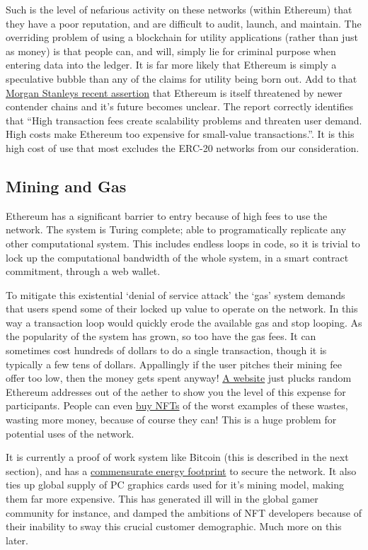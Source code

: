 Such is the level of nefarious activity on these networks (within Ethereum) that they have a poor reputation, and are difficult to audit, launch, and maintain. The overriding problem of using a blockchain for utility applications (rather than just as money) is that people can, and will, simply lie for criminal purpose when entering data into the ledger. It is far more likely that Ethereum is simply a speculative bubble than any of the claims for utility being born out. Add to that \href{https://advisor.morganstanley.com/daron.edwards/documents/field/d/da/daron-edwards/Cryptocurrency_201__What_is_Ethereum_.pdf}{Morgan Stanleys recent assertion} that Ethereum is itself threatened by newer contender chains and it's future becomes unclear. The report correctly identifies that ``High transaction fees create scalability problems and threaten user demand. High costs make Ethereum too expensive for small-value transactions.''. It is this high cost of use that most excludes the ERC-20 networks from our consideration.
\subsection{Mining and Gas}
Ethereum has a significant barrier to entry because of high fees to use the network. The system is Turing complete; able to programatically replicate any other computational system. This includes endless loops in code, so it is trivial to lock up the computational bandwidth of the whole system, in a smart contract commitment, through a web wallet. \par 
To mitigate this existential `denial of service attack' the `gas' system demands that users spend some of their locked up value to operate on the network. In this way a transaction loop would quickly erode the available gas and stop looping. As the popularity of the system has grown, so too have the gas fees. It can sometimes cost hundreds of dollars to do a single transaction, though it is typically a few tens of dollars. Appallingly if the user pitches their mining fee offer too low, then the money gets spent anyway! \href{https://fees.wtf/#/}{A website} just plucks random Ethereum addresses out of the aether to show you the level of this expense for participants. People can even \href{https://opensea.io/collection/fees-wtf-nft?search[sortAscending]=false&search[sortBy]=PRICE}{buy NFTs} of the worst examples of these wastes, wasting more money, because of course they can! This is a huge problem for potential uses of the network. \par
It is currently a proof of work system like Bitcoin (this is described in the next section), and has a \href{https://news.trust.org/packages/cryptocurrency-and-climate/}{commensurate energy footprint} to secure the network. It also ties up global supply of PC graphics cards used for it's mining model, making them far more expensive. This has generated ill will in the global gamer community for instance, and damped the ambitions of NFT developers because of their inability to sway this crucial customer demographic. Much more on this later.\par
